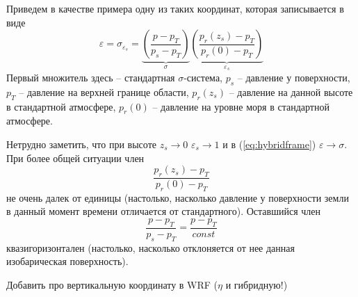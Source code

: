 Приведем в качестве примера одну из таких координат, которая записывается в виде
    \begin{equation}
    \label{eq:hybridframe}
        \varepsilon= \sigma_{\varepsilon_s} =
        \underbrace{\left( \frac{p-p_T}{p_s-p_T} \right)}_{\sigma}
        \underbrace{\left( \frac{p_r(z_s) - p_T}{p_r(0) - p_T} \right)}_{\varepsilon_s}
    \end{equation}
Первый множитель здесь -- стандартная $\sigma$-система, $p_s$ -- давление у поверхности, $p_T$ -- давление на верхней границе области, $p_r(z_s)$ -- давление на данной высоте в стандартной атмосфере, $p_r(0)$ -- давление на уровне моря в стандартной атмосфере. 

Нетрудно заметить, что при высоте $z_s\rightarrow0$ $\varepsilon_s\rightarrow1$ и в (\ref{eq:hybridframe}) $\varepsilon\rightarrow\sigma$. При более общей ситуации член 
    \begin{equation*}
         \frac{p_r(z_s) - p_T}{p_r(0) - p_T} 
    \end{equation*}
не очень далек от единицы (настолько, насколько давление у поверхности земли в данный момент времени отличается от стандартного). Оставшийся член 
    \begin{equation*}
         \frac{p-p_T}{p_s-p_T}=\frac{p-p_T}{const} 
    \end{equation*}
квазигоризонтален (настолько, насколько отклоняется от нее данная изобарическая поверхность).

   \begin{warn}
        Добавить про вертикальную координату в WRF ($\eta$ и гибридную!) 
   \end{warn}

